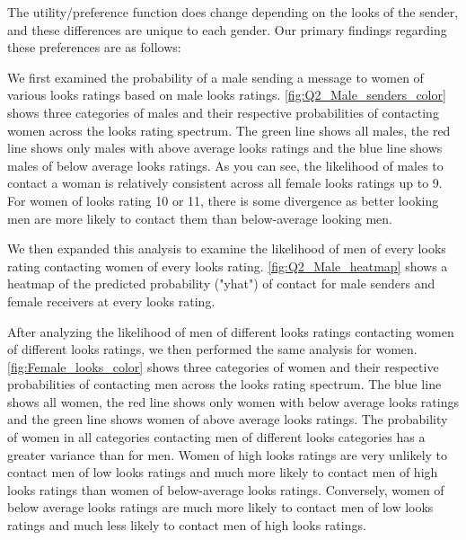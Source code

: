 The utility/preference function does change depending on the looks of the sender, and these differences are unique to each gender.  Our primary findings regarding these preferences are as follows:

We first examined the probability of a male sending a message to women of various looks ratings based on male looks ratings. \vref{fig:Q2_Male_senders_color} shows three categories of males and their respective probabilities of contacting women across the looks rating spectrum.  The green line shows all males, the red line shows only males with above average looks ratings and the blue line shows males of below average looks ratings.  As you can see, the likelihood of males to contact a woman is relatively consistent across all female looks ratings up to 9.  For women of looks rating 10 or 11, there is some divergence as better looking men are more likely to contact them than below-average looking men.  


We then expanded this analysis to examine the likelihood of men of every looks rating contacting women of every looks rating.  \vref{fig:Q2_Male_heatmap} shows a heatmap of the predicted probability ("yhat") of contact for male senders and female receivers at every looks rating.


After analyzing the likelihood of men of different looks ratings contacting women of different looks ratings, we then performed the same analysis for women. \vref{fig:Female_looks_color} shows three categories of women and their respective probabilities of contacting men across the looks rating spectrum. The blue line shows all women, the red line shows only women with below average looks ratings and the green line shows women of above average looks ratings.  The probability of women in all categories contacting men of different looks categories has a greater variance than for men.  Women of high looks ratings are very unlikely to contact men of low looks ratings and much more likely to contact men of high looks ratings than women of below-average looks ratings.  Conversely, women of below average looks ratings are much more likely to contact men of low looks ratings and much less likely to contact men of high looks ratings.  

